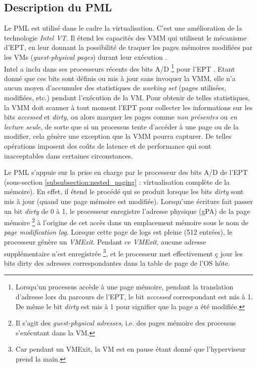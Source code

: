 \subsection{Description du PML}
\label{subsubsection:description_pml}
Le \acs{PML} est utilisé dans le cadre la virtualisation. C'est une amélioration de la technologie \textit{\ac{Intel VT}}. Il étend les capacités des VMM qui utilisent le mécanisme d'\acs{EPT}, en leur donnant la possibilité de traquer les pages mémoires modifiées par les \acs{VMs} (\textit{guest-physical pages}) durant leur exécution \cite{online5}.\\
Intel a inclu dans ses processeurs récents des bits \ac{A/D} \footnote{Lorsqu'un processus accède à une page mémoire, pendant la translation d'adresse lors du parcours de l'EPT, le bit \textit{accessed} correspondant est mis à 1. De même le bit \textit{dirty} est mis à 1 pour signifier que la page a été modifiée.} pour l'\acs{EPT} \cite{book3}. Etant donné que ces bits sont définis ou mis à jour sans invoquer la VMM, elle n'a aucun moyen d'accumuler des statistiques de \textit{working set} (pages utilisées, modifiées, etc.) pendant l'exécution de la VM. Pour obtenir de telles statistiques, la VMM doit scanner à tout moment l'EPT pour collecter les informations sur les bits \textit{accessed} et \textit{dirty}, ou alors marquer les pages comme \textit{non présentes} ou \emph{en lecture seule}, de sorte que si un processus tente d'accéder à une page ou de la modifier, cela génère une exception que la VMM pourra capturer. De telles opérations imposent des coûts de latence et de performance qui sont inacceptables dans certaines circonstances.\\

\par\noindent Le PML s'appuie sur la prise en charge par le processeur des bits \acs{A/D} de l'\acs{EPT} (sous-section \ref{subsubsection:nested_paging} : virtualisation complète de la mémoire). En effet, il étend le procédé qui se produit lorsque les bits \textit{dirty} sont mis à jour (quand une page mémoire est modifiée). Lorsqu'une écriture fait passer un bit \textit{dirty} de 0 à 1, le processeur enregistre l'adresse physique (\acs{gPA}) de la page mémoire \footnote{Il s'agit des \textit{guest-physical adresses}, i.e. des pages mémoire des processus s'exécutant dans la VM.} à l'origine de cet accès dans un emplacement mémoire sous le nom de \textit{page modification log}. Lorsque cette page de logs est pleine (512 entrées), le processeur génère un \textit{VMExit}. Pendant ce \textit{VMExit}, aucune adresse supplémentaire n'est enregistrée \footnote{Car pendant un VMExit, la VM est en pause étant donné que l'hyperviseur prend la main.}, et le processeur met effectivement ç jour les bits dirty des adresses correspondantes dans la table de page de l'OS hôte.\\

